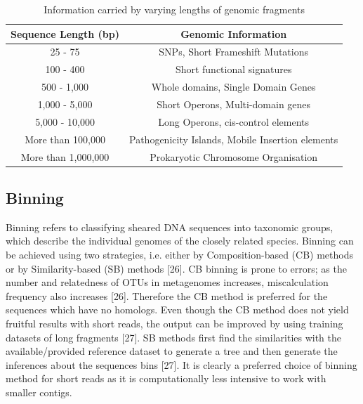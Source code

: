 \begin{table}[ht]
\centering
\caption{Information carried by varying lengths of genomic fragments}
 \begin{tabular}{|c | c|} 
 \hline
 Sequence Length (bp) & Genomic Information \\ [0.5ex] 
 \hline\hline
 25 - 75 & SNPs, Short Frameshift Mutations \\ 
 \hline
 100 - 400 & Short functional signatures \\
 \hline
 500 - 1,000 & Whole domains, Single Domain Genes \\
 \hline
 1,000 - 5,000 & Short Operons, Multi-domain genes \\
 \hline
 5,000 - 10,000 & Long Operons, cis-control elements \\
 \hline
 More than 100,000 & Pathogenicity Islands, Mobile Insertion elements \\
 \hline
 More than 1,000,000 & Prokaryotic Chromosome Organisation \\
 \hline
\end{tabular}
\label{table1}
\end{table}

\subsection{Binning}
Binning refers to classifying sheared DNA sequences into taxonomic groups, which describe the individual genomes of the closely related species. Binning can be achieved using two strategies, i.e. either by Composition-based (CB) methods or by Similarity-based (SB) methods [26]. CB binning is prone to errors; as the number and relatedness of OTUs in metagenomes increases, miscalculation frequency also increases [26]. Therefore the CB method is preferred for the sequences which have no homologs. Even though the CB method does not yield fruitful results with short reads, the output can be improved by using training datasets of long fragments [27]. SB methods first find the similarities with the available/provided reference dataset to generate a tree and then generate the inferences about the sequences bins [27]. It is clearly a preferred choice of binning method for short reads as it is computationally less intensive to work with smaller contigs.

